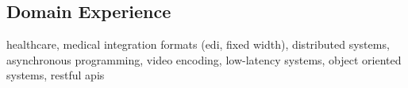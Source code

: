 \documentclass[11pt,a4paper,sans]{moderncv}        %
\begin{document}
\subsection{Domain Experience}
  healthcare, medical integration formats (edi, fixed width), \newline
  \hfill distributed systems, asynchronous programming, video encoding, \newline
  low-latency \newline
  systems, object oriented systems, restful apis

% 



\end{document}

